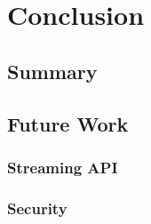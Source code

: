 
\chapter{Conclusion}\label{chapter:conclusion}

\section{Summary}
\section{Future Work}
\subsection{Streaming API}
\subsection{ Security}
